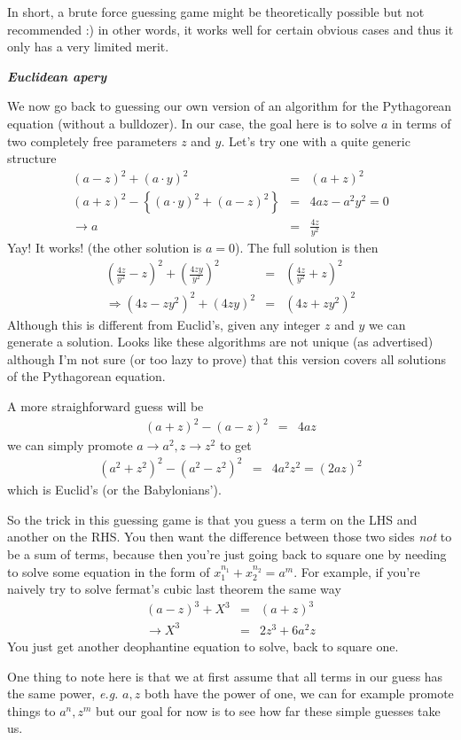 \documentclass[aps,preprint,preprintnumbers,nofootinbib,showpacs,prd]{revtex4-1}
\newcommand{\eg}{{\it e.g.} }
\newcommand{\nbea}{\begin{eqnarray*}}
\newcommand{\neea}{\end{eqnarray*}}
\begin{document}
In short, a brute force guessing game might be theoretically possible but not recommended :) in other words, it works well for certain obvious cases and thus it only has a very limited merit.

\bigskip\textbf{\textit{Euclidean apery}}

We now go back to guessing our own version of an algorithm for the Pythagorean equation (without a bulldozer). In our case, the goal here is to solve $a$ in terms of two completely free parameters $z$ and $y$. Let's try one with a quite generic structure
%
\nbea
(a - z)^2 + (a\cdot y)^2  & = & (a + z)^2 \\
(a + z)^2 - \left \{ (a \cdot y)^2 + (a - z)^2 \right \} & = & 4 a z - a^2 y^2 = 0 \\
\rightarrow a & = & \frac{4 z}{y^2}
\neea
%
Yay! It works! (the other solution is $a=0$). The full solution is then
%
\nbea
\left ( \frac{4 z}{y^2} - z\right )^2 + \left ( \frac{4 z y}{y^2} \right )^2 & = & \left ( \frac{4 z}{y^2} + z\right )^2 \\
\Rightarrow \left ( 4 z - z y^2\right )^2 + \left ( 4 z y \right )^2 & = & \left ( 4 z + z y^2\right )^2
\neea
%
Although this is different from Euclid's, given any integer $z$ and $y$ we can generate a solution. Looks like these algorithms are not unique (as advertised) although I'm not sure (or too lazy to prove) that this version covers all solutions of the Pythagorean equation.

A more straighforward guess will be
%
\nbea
(a + z)^2 - (a - z)^2 & = & 4az
\neea
%
we can simply promote $a \to a^2, z \to z^2$ to get
%
\nbea
(a^2 + z^2)^2 - (a^2 - z^2)^2 & = & 4a^2z^2 = (2az)^2
\neea
%
which is Euclid's (or the Babylonians').

So the trick in this guessing game is that you guess a term on the LHS and another on the RHS. You then want the difference between those two sides {\it not} to be a sum of terms, because then you're just going back to square one by needing to solve some equation in the form of $x_1^{n_1} + x_2^{n_2} = a^m$. For example, if you're naively try to solve fermat's cubic last theorem the same way
%
\nbea
(a-z)^3 + X^3 & = & (a+z)^3 \\
\rightarrow X^3 & = & 2z^3 + 6a^2 z
\neea
%
You just get another deophantine equation to solve, back to square one.

One thing to note here is that we at first assume that all terms in our guess has the same power, \eg $a, z$ both have the power of one, we can for example promote things to $a^n, z^m$ but our goal for now is to see how far these simple guesses take us.
\end{document}
